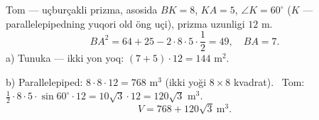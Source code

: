 \newpage
{}
Tom — uçburçakli prizma, asosida $BK=8$, $KA=5$, $\angle K=60^\circ$ ($K$ — parallelepipedning yuqori old öng uçi), prizma uzunligi $12$ m.
\[BA^2=64+25-2\cdot8\cdot5\cdot\frac12=49,\quad BA=7.\]
a) Tunuka — ikki yon yoq: $(7+5)\cdot12=144$ m$^2$.

b) Parallelepiped: $8\cdot8\cdot12=768$ m$^3$ (ikki yoği $8\times8$ kvadrat). \ Tom: $\frac12\cdot8\cdot5\cdot\sin60^\circ\cdot12=10\sqrt3\cdot12=120\sqrt3$ m$^3$.
\[V=768+120\sqrt3\ \text{m}^3.\]

\ShowJavoblar

